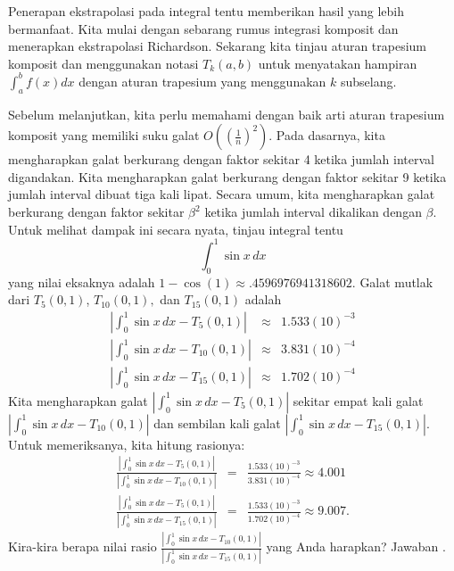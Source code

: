 Penerapan ekstrapolasi pada integral tentu memberikan hasil yang lebih
bermanfaat. Kita mulai dengan sebarang rumus integrasi komposit dan
menerapkan ekstrapolasi Richardson. Sekarang kita tinjau aturan trapesium
komposit dan menggunakan notasi $T_{k}(a,b)$ untuk menyatakan hampiran
$\int_{a}^{b}f(x)dx$ dengan aturan trapesium yang menggunakan $k$
subselang.

Sebelum melanjutkan, kita perlu memahami dengan baik arti aturan trapesium
komposit yang memiliki suku galat $O\left(\left(\frac{1}{n}\right)^{2}\right)$.
Pada dasarnya, kita mengharapkan galat berkurang dengan faktor sekitar
4 ketika jumlah interval digandakan. Kita mengharapkan galat berkurang
dengan faktor sekitar 9 ketika jumlah interval dibuat tiga kali lipat.
Secara umum, kita mengharapkan galat berkurang dengan faktor sekitar
$\beta^{2}$ ketika jumlah interval dikalikan dengan $\beta$. Untuk
melihat dampak ini secara nyata, tinjau integral tentu
\[
\int_{0}^{1}\sin x\,dx
\]
yang nilai eksaknya adalah $1-\cos(1)\approx.4596976941318602$. Galat
mutlak dari $T_{5}(0,1)$, $T_{10}(0,1),$ dan $T_{15}(0,1)$ adalah
\begin{eqnarray*}
\left|\int_{0}^{1}\sin x\,dx-T_{5}(0,1)\right| & \approx & 1.533(10)^{-3}\\
\left|\int_{0}^{1}\sin x\,dx-T_{10}(0,1)\right| & \approx & 3.831(10)^{-4}\\
\left|\int_{0}^{1}\sin x\,dx-T_{15}(0,1)\right| & \approx & 1.702(10)^{-4}
\end{eqnarray*}
Kita mengharapkan galat $\left|\int_{0}^{1}\sin x\,dx-T_{5}(0,1)\right|$
sekitar empat kali galat $\left|\int_{0}^{1}\sin x\,dx-T_{10}(0,1)\right|$
dan sembilan kali galat $\left|\int_{0}^{1}\sin x\,dx-T_{15}(0,1)\right|$.
Untuk memeriksanya, kita hitung rasionya:
\begin{eqnarray*}
\frac{\left|\int_{0}^{1}\sin x\,dx-T_{5}(0,1)\right|}{\left|\int_{0}^{1}\sin x\,dx-T_{10}(0,1)\right|} & = & \frac{1.533(10)^{-3}}{3.831(10)^{-4}}\approx4.001\\
\frac{\left|\int_{0}^{1}\sin x\,dx-T_{5}(0,1)\right|}{\left|\int_{0}^{1}\sin x\,dx-T_{15}(0,1)\right|} & = & \frac{1.533(10)^{-3}}{1.702(10)^{-4}}\approx9.007.
\end{eqnarray*}
Kira-kira berapa nilai rasio $\frac{\left|\int_{0}^{1}\sin x\,dx-T_{10}(0,1)\right|}{\left|\int_{0}^{1}\sin x\,dx-T_{15}(0,1)\right|}$
yang Anda harapkan? Jawaban .

